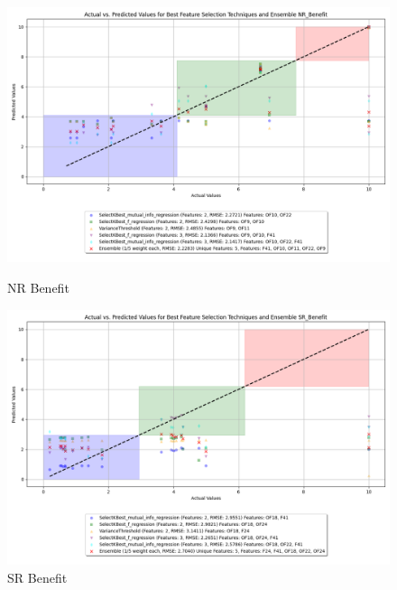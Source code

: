\begin{figure}[H]
    \centering
    \begin{minipage}{0.45\textwidth}
        \centering
        \includegraphics[width=\linewidth]{reg_section_specific/images_reg_featred_ensemble/actual_vs_predicted_smallest_feature_selection_and_ensemble_NR_Benefit.png}
        \caption{NR Benefit}
        \label{fig_reg_spec:nr_ben_reg_featred_smallest_ensemble}
    \end{minipage}\hfill
    \begin{minipage}{0.45\textwidth}
        \centering
        \includegraphics[width=\linewidth]{reg_section_specific/images_reg_featred_ensemble/actual_vs_predicted_smallest_feature_selection_and_ensemble_SR_Benefit.png}
        \caption{SR Benefit}
        \label{fig_reg_spec:sr_ben_reg_featred_smallest_ensemble}
    \end{minipage}
\end{figure}

